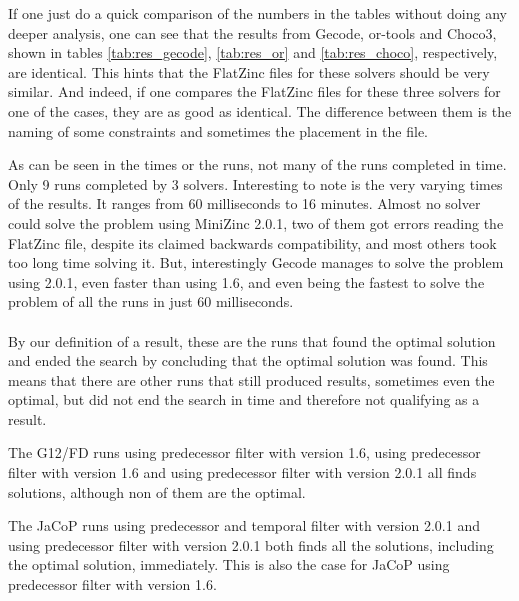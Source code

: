 











If one just do a quick comparison of the numbers in the tables without doing any deeper analysis, one can see that the results from Gecode, or-tools and Choco3, shown in tables \ref{tab:res_gecode}, \ref{tab:res_or} and \ref{tab:res_choco}, respectively, are identical. This hints that the FlatZinc files for these solvers should be very similar. And indeed, if one compares the FlatZinc files for these three solvers for one of the cases, they are as good as identical. The difference between them is the naming of some constraints and sometimes the placement in the file.

As can be seen in the times or the runs, not many of the runs completed in time. Only 9 runs completed by 3 solvers. Interesting to note is the very varying times of the results. It ranges from 60 milliseconds to 16 minutes. Almost no solver could solve the problem using MiniZinc 2.0.1, two of them got errors reading the FlatZinc file, despite its claimed backwards compatibility, and most others took too long time solving it. But, interestingly Gecode manages to solve the problem using 2.0.1, even faster than using 1.6, and even being the fastest to solve the problem of all the runs in just 60 milliseconds.
\\\\
By our definition of a result, these are the runs that found the optimal solution and ended the search by concluding that the optimal solution was found. This means that there are other runs that still produced results, sometimes even the optimal, but did not end the search in time and therefore not qualifying as a result.

The G12/FD runs using predecessor filter with version 1.6, using predecessor filter with version 1.6 and using predecessor filter with version 2.0.1 all finds solutions, although non of them are the optimal.

The JaCoP runs using predecessor and temporal filter with version 2.0.1 and using predecessor filter with version 2.0.1 both finds all the solutions, including the optimal solution, immediately. This is also the case for JaCoP using predecessor filter with version 1.6.

